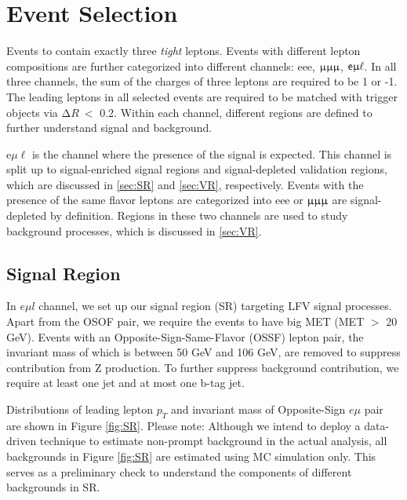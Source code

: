 \chapter{Event Selection}
\label{chap:Selection}

Events to contain exactly three \emph{tight} leptons. Events with different lepton compositions are further categorized into different channels: eee, $\upmu\upmu\upmu$, $\textsf{e}\upmu\ell$. In all three channels, the sum of the charges of three leptons are required to be 1 or -1. The leading leptons in all selected events are required to be matched with trigger objects via $\mathrm{\Delta} R~<$ 0.2. Within each channel, different regions are defined to further understand signal and background.

e$\mu\ell$ is the channel where the presence of the signal is expected. This channel is split up to signal-enriched signal regions and signal-depleted validation regions, which are discussed in \autoref{sec:SR} and \autoref{sec:VR}, respectively. Events with the presence of the same flavor leptons are categorized into eee or $\upmu\upmu\upmu$ are signal-depleted by definition. Regions in these two channels are used to study background processes, which is discussed in \autoref{sec:VR}.
\section{Signal Region}
\label{sec:SR}

In $e\mu l$ channel, we set up our signal region (SR) targeting LFV signal processes. Apart from the OSOF pair, we require the events to have big MET (MET $>$ 20 GeV). Events with an Opposite-Sign-Same-Flavor (OSSF) lepton pair, the invariant mass of which is between 50 GeV and 106 GeV, are removed to suppress contribution from Z production. To further suppress background contribution, we require at least one jet and at most one b-tag jet.

Distributions of leading lepton $p_{T}$ and invariant mass of Opposite-Sign $e\mu$ pair are shown in Figure \ref{fig:SR}. Please note: Although we intend to deploy a data-driven technique to estimate non-prompt background in the actual analysis, all backgrounds in Figure \ref{fig:SR} are estimated using MC simulation only. This serves as a preliminary check to understand the components of different backgrounds in SR. 

